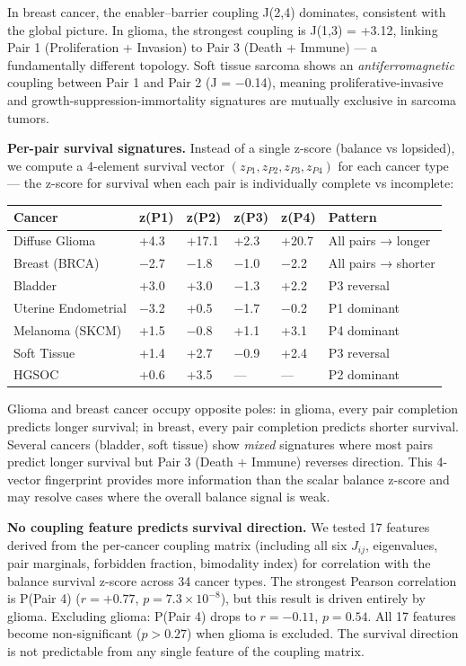 \documentclass[
  11pt,
]{article}
\newcounter{none} %
\begin{document}
In breast cancer, the enabler--barrier coupling J(2,4) dominates,
consistent with the global picture. In glioma, the strongest coupling is
J(1,3) = +3.12, linking Pair 1 (Proliferation + Invasion) to Pair 3
(Death + Immune) --- a fundamentally different topology. Soft tissue
sarcoma shows an \emph{antiferromagnetic} coupling between Pair 1 and
Pair 2 (J = −0.14), meaning proliferative-invasive and
growth-suppression-immortality signatures are mutually exclusive in
sarcoma tumors.

\textbf{Per-pair survival signatures.} Instead of a single z-score
(balance vs lopsided), we compute a 4-element survival vector
\((z_{P1}, z_{P2}, z_{P3}, z_{P4})\) for each cancer type --- the
z-score for survival when each pair is individually complete vs
incomplete:

{\def\LTcaptype{none} %
\begin{longtable}[]{@{}llllll@{}}
\toprule\noalign{}
Cancer & z(P1) & z(P2) & z(P3) & z(P4) & Pattern \\
\midrule\noalign{}
\endhead
\bottomrule\noalign{}
\endlastfoot
Diffuse Glioma & +4.3 & +17.1 & +2.3 & +20.7 & All pairs → longer \\
Breast (BRCA) & −2.7 & −1.8 & −1.0 & −2.2 & All pairs → shorter \\
Bladder & +3.0 & +3.0 & −1.3 & +2.2 & P3 reversal \\
Uterine Endometrial & −3.2 & +0.5 & −1.7 & −0.2 & P1 dominant \\
Melanoma (SKCM) & +1.5 & −0.8 & +1.1 & +3.1 & P4 dominant \\
Soft Tissue & +1.4 & +2.7 & −0.9 & +2.4 & P3 reversal \\
HGSOC & +0.6 & +3.5 & --- & --- & P2 dominant \\
\end{longtable}
}

Glioma and breast cancer occupy opposite poles: in glioma, every pair
completion predicts longer survival; in breast, every pair completion
predicts shorter survival. Several cancers (bladder, soft tissue) show
\emph{mixed} signatures where most pairs predict longer survival but
Pair 3 (Death + Immune) reverses direction. This 4-vector fingerprint
provides more information than the scalar balance z-score and may
resolve cases where the overall balance signal is weak.

\textbf{No coupling feature predicts survival direction.} We tested 17
features derived from the per-cancer coupling matrix (including all six
\(J_{ij}\), eigenvalues, pair marginals, forbidden fraction, bimodality
index) for correlation with the balance survival z-score across 34
cancer types. The strongest Pearson correlation is P(Pair 4)
(\(r = +0.77\), \(p = 7.3 \times 10^{-8}\)), but this result is driven
entirely by glioma. Excluding glioma: P(Pair 4) drops to \(r = -0.11\),
\(p = 0.54\). All 17 features become non-significant (\(p > 0.27\)) when
glioma is excluded. The survival direction is not predictable from any
single feature of the coupling matrix.
\end{document}

